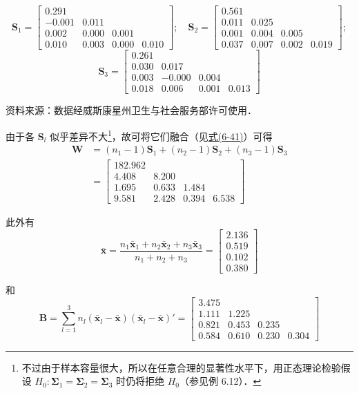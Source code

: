 

\[
\mathbf{S}_1=\begin{bmatrix}0.291&&&\\-0.001&0.011&&\\0.002&0.000&0.001&\\0.010&0.003&0.000&0.010\end{bmatrix};\quad
\mathbf{S}_2=\begin{bmatrix}0.561&&&\\0.011&0.025&&\\0.001&0.004&0.005&\\0.037&0.007&0.002&0.019\end{bmatrix};
\]
\[
\mathbf{S}_3=\begin{bmatrix}0.261&&&\\0.030&0.017&&\\0.003&-0.000&0.004&\\0.018&0.006&0.001&0.013\end{bmatrix}
\]

资料来源：数据经威斯康星州卫生与社会服务部许可使用．

由于各 $\mathbf{S}_l$ 似乎差异不大\footnote{不过由于样本容量很大，所以在任意合理的显著性水平下，用正态理论检验假设 $H_0:\boldsymbol{\Sigma}_1=\boldsymbol{\Sigma}_2=\boldsymbol{\Sigma}_3$ 时仍将拒绝 $H_0$（参见例 6.12）．}，故可将它们融合（见\hyperref[eq:6-41]{式(6-41)}）可得
\[
\begin{aligned}
\mathbf{W}&=(n_1-1)\mathbf{S}_1+(n_2-1)\mathbf{S}_2+(n_3-1)\mathbf{S}_3\\
&=\begin{bmatrix}182.962&&&\\4.408&8.200&&\\1.695&0.633&1.484&\\9.581&2.428&0.394&6.538\end{bmatrix}
\end{aligned}
\]

此外有
\[
\bar{\mathbf{x}}=\frac{n_1\bar{\mathbf{x}}_1+n_2\bar{\mathbf{x}}_2+n_3\bar{\mathbf{x}}_3}{n_1+n_2+n_3}
=\begin{bmatrix}2.136\\0.519\\0.102\\0.380\end{bmatrix}
\]

和
\[
\mathbf{B}=\sum_{l=1}^{3}n_l(\bar{\mathbf{x}}_l-\bar{\mathbf{x}})(\bar{\mathbf{x}}_l-\bar{\mathbf{x}})'=
\begin{bmatrix}3.475&&&\\1.111&1.225&&\\0.821&0.453&0.235&\\0.584&0.610&0.230&0.304\end{bmatrix}
\]

